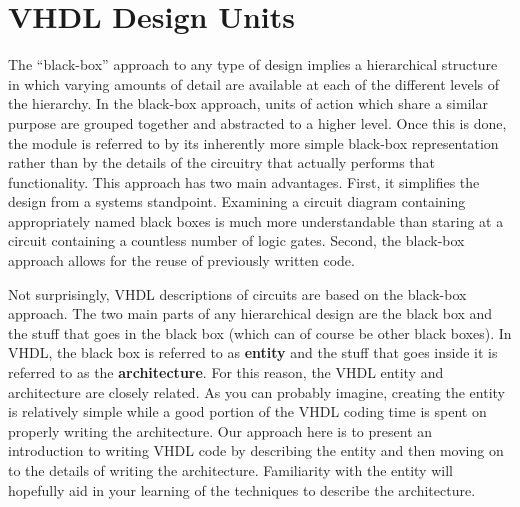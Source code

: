 %
%
%
\chapter{VHDL Design Units}
The ``black-box'' approach to any type of design implies a hierarchical structure in which varying amounts of detail are available at each of the different levels of the hierarchy. In the black-box approach, units of action which share a similar purpose are grouped together and abstracted to a higher level. Once this is done, the module is referred to by its inherently more simple black-box representation rather than by the details of the circuitry that actually performs that functionality. This approach has two main advantages. First, it simplifies the design from a systems standpoint. Examining a circuit diagram containing appropriately named black boxes is much more understandable than staring at a circuit containing a countless number of logic gates. Second, the black-box approach allows for the reuse of previously written code.

Not surprisingly, VHDL descriptions of circuits are based on the black-box approach. The two main parts of any hierarchical design are the black box and the stuff that goes in the black box (which can of course be other black boxes). In VHDL, the black box is referred to as \textbf{entity} and the stuff that goes inside it is referred to as the \textbf{architecture}. For this reason, the VHDL entity and architecture are closely related. As you can probably imagine, creating the entity is relatively simple while a good portion of the VHDL coding time is spent on properly writing the architecture. Our approach here is to present an introduction to writing VHDL code by describing the entity and then moving on to the details of writing the architecture. Familiarity with the entity will hopefully aid in your learning of the techniques to describe the architecture.

